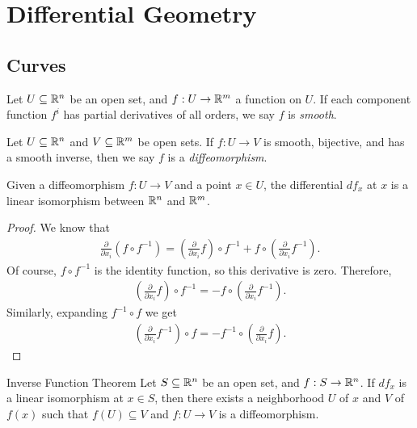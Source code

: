 \setchaptergraphic{}

\chapter{Differential Geometry}
\label{ch:diffgeo}

\section{Curves}

\begin{defn}
    Let $U \subseteq \mathbb{R}^n$ be an open set, and $f: U \to \mathbb{R}^m$ a function on $U$. If each component function $f^i$ has partial derivatives of all orders, we say $f$ is \emph{smooth}.
\end{defn}

\begin{defn}
    Let $U \subseteq \mathbb{R}^n$ and $V \subseteq \mathbb{R}^m$ be open sets. If $f: U \to V$ is smooth, bijective, and has a smooth inverse, then we say $f$ is a \emph{diffeomorphism}.
\end{defn}

\begin{prop}
    Given a diffeomorphism $f: U \to V$ and a point $x \in U$, the differential $df_x$ at $x$ is a linear isomorphism between $\mathbb{R}^n$ and $\mathbb{R}^m$.
\end{prop}

\begin{proof}
    We know that
    \begin{align*}
        \frac{\partial}{\partial x_i}\left(f \circ f^{-1}\right) = \left(\frac{\partial}{\partial x_i}f\right) \circ f^{-1} + f \circ \left(\frac{\partial}{\partial x_i}f^{-1}\right).
    \end{align*}
    Of course, $f \circ f^{-1}$ is the identity function, so this derivative is zero. Therefore,
    \begin{align*}
        \left(\frac{\partial}{\partial x_i}f\right) \circ f^{-1} = -f \circ \left(\frac{\partial}{\partial x_i}f^{-1}\right).
    \end{align*}
    Similarly, expanding $f^{-1} \circ f$ we get
    \begin{align*}
        \left(\frac{\partial}{\partial x_i}f^{-1}\right) \circ f = -f^{-1} \circ \left(\frac{\partial}{\partial x_i}f\right).
    \end{align*}
\end{proof}

\begin{thm}{Inverse Function Theorem}\label{thm:inverse-function}\proofbreak
    Let $S \subseteq \mathbb{R}^n$ be an open set, and $f: S \to \mathbb{R}^n$. If $df_x$ is a linear isomorphism at $x \in S$, then there exists a neighborhood $U$ of $x$ and $V$ of $f(x)$ such that $f(U) \subseteq V$ and $f: U \to V$ is a diffeomorphism.
\end{thm}


